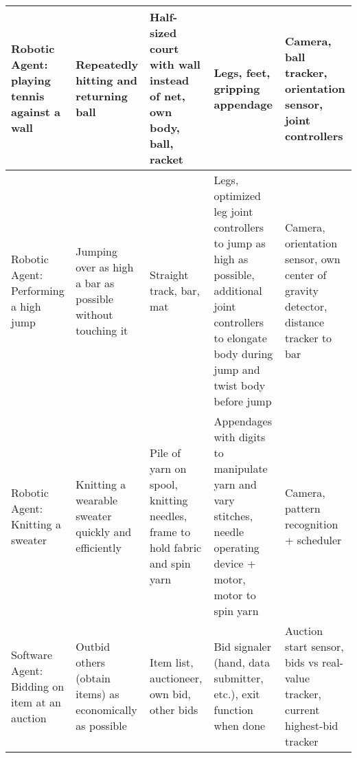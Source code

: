 \documentclass[10pt]{article}
\begin{document}
\begin{enumerate}
\begin{tabular}{|L||L|L|L|L|}
      \hline
      Robotic Agent: playing tennis against a wall & Repeatedly hitting and returning ball & Half-sized court with wall instead of net, own body, ball, racket & Legs, feet, gripping appendage & Camera, ball tracker, orientation sensor, joint controllers \\
      \hline
      Robotic Agent: Performing a high jump & Jumping over as high a bar as possible without touching it & Straight track, bar, mat & Legs, optimized leg joint controllers to jump as high as possible, additional joint controllers to elongate body during jump and twist body before jump & Camera, orientation sensor, own center of gravity detector, distance tracker to bar \\
      \hline
      Robotic Agent: Knitting a sweater & Knitting a wearable sweater quickly and efficiently & Pile of yarn on spool, knitting needles, frame to hold fabric and spin yarn & Appendages with digits to manipulate yarn and vary stitches, needle operating device + motor, motor to spin yarn & Camera, pattern recognition + scheduler \\
      \hline
      \newpage
      Software Agent: Bidding on item at an auction & Outbid others (obtain items) as economically as possible & Item list, auctioneer, own bid, other bids & Bid signaler (hand, data submitter, etc.), exit function when done & Auction start sensor, bids vs real-value tracker, current highest-bid tracker \\
      \hline                                                                 
    \end{tabular}

\newpage


\end{enumerate}
\end{document}
